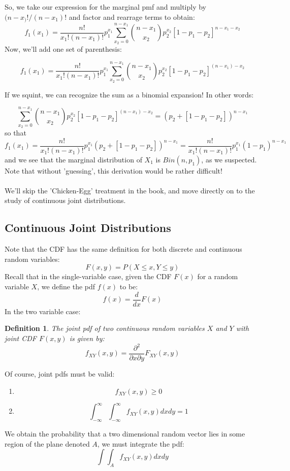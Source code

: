 \documentclass[12pt]{article} %
\newtheorem{defn}{Definition}
\begin{document}
So, we take our expression for the marginal pmf and multiply by $(n-x_)!/(n-x_1)!$ and factor and rearrage terms to obtain:
$$f_1(x_1) = \frac{n!}{x_1!(n-x_1)!}p_1^{x_1} \sum_{x_2=0}^{n-x_1} {{n-x_1}\choose{x_2}}p_2^{x_2}\left[1-p_1-p_2\right]^{n-x_1-x_2}$$
Now, we'll add one set of parenthesis:

$$f_1(x_1) = \frac{n!}{x_1!(n-x_1)!}p_1^{x_1} \sum_{x_2=0}^{n-x_1} {{n-x_1}\choose{x_2}}p_2^{x_2}\left[1-p_1-p_2\right]^{(n-x_1)-x_2}$$

If we squint, we can recognize the sum as a binomial expansion! In other words:

$$\sum_{x_2=0}^{n-x_1} {{n-x_1}\choose{x_2}}p_2^{x_2}\left[1-p_1-p_2\right]^{(n-x_1)-x_2} = \left(p_2 + \left[1-p_1-p_2\right]\right)^{n-x_1}$$
so that 
$$f_1(x_1) = \frac{n!}{x_1!(n-x_1)!}p_1^{x_1} \left(p_2 + \left[1-p_1-p_2\right]\right)^{n-x_1} = \frac{n!}{x_1!(n-x_1)!}p_1^{x_1} (1-p_1)^{n-x_1}$$
and we see that the marginal distribution of $X_1$ is $Bin(n,p_1)$, as we suspected. Note that without 'guessing', this derivation would be rather difficult!\\\\
We'll skip the 'Chicken-Egg' treatment in the book, and move directly on to the study of continuous joint distributions.

\subsection{Continuous Joint Distributions}
Note that the CDF has the same definition for both discrete and continuous random variables:
$$F(x,y) = P(X\leq x,Y\leq y)$$
Recall that in the single-variable case, given the CDF $F(x)$ for a random variable $X$, we define the pdf $f(x)$ to be: 
$$f(x) = \frac{d}{dx} F(x)$$
In the two variable case:
\begin{defn}
The joint pdf of two continuous random variables $X$ and $Y$ with joint CDF $F(x,y)$ is given by:
$$f_{XY}(x,y) = \frac{\partial^2}{\partial x\partial y}F_{XY}(x,y)$$
\end{defn}
Of course, joint pdfs must be valid:
\begin{enumerate}
\item $$f_{XY}(x,y) \geq 0$$
\item $$\int_{-\infty}^\infty\int_{-\infty}^\infty f_{XY}(x,y) dx dy = 1$$
\end{enumerate}
We obtain the probability that a two dimensional random vector lies in some region of the plane denoted $A$, we must integrate the pdf:
$$\int\int_A f_{XY}(x,y) dx dy$$
 
\end{document}
